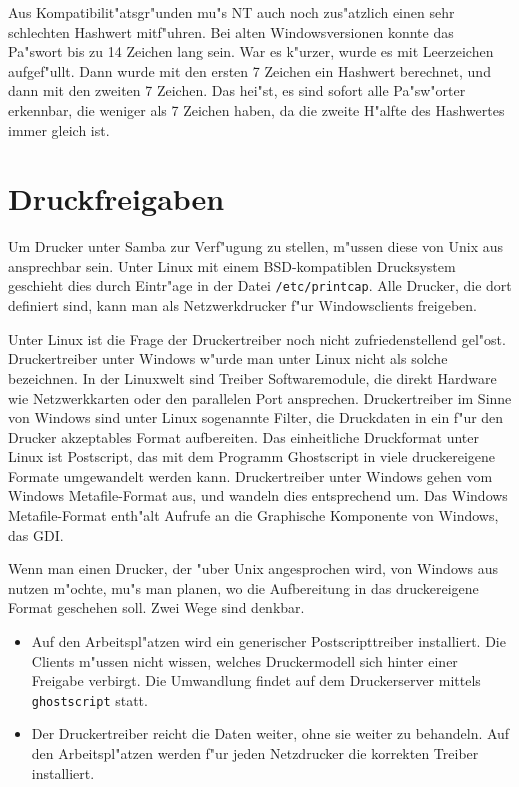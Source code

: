 \documentclass{scrartcl}
\newcommand{\prog}{\texttt}
\newcommand{\datei}{\texttt}
\begin{document}
Aus Kompatibilit"atsgr"unden mu"s NT auch noch zus"atzlich einen sehr
schlechten Hashwert mitf"uhren. Bei alten Windowsversionen konnte das
Pa"swort bis zu 14 Zeichen lang sein. War es k"urzer, wurde es mit
Leerzeichen aufgef"ullt. Dann wurde mit den ersten 7 Zeichen ein
Hashwert berechnet, und dann mit den zweiten 7 Zeichen. Das hei"st, es
sind sofort alle Pa"sw"orter erkennbar, die weniger als 7 Zeichen
haben, da die zweite H"alfte des Hashwertes immer gleich ist.

\section{Druckfreigaben}

Um Drucker unter Samba zur Verf"ugung zu stellen, m"ussen diese von
Unix aus ansprechbar sein. Unter Linux mit einem BSD-kompatiblen
Drucksystem geschieht dies durch Eintr"age in der Datei
\datei{/etc/printcap}. Alle Drucker, die dort definiert sind, kann man
als Netzwerkdrucker f"ur Windowsclients freigeben.

Unter Linux ist die Frage der Druckertreiber noch nicht
zufriedenstellend gel"ost. Druckertreiber unter Windows w"urde man
unter Linux nicht als solche bezeichnen. In der Linuxwelt sind Treiber
Softwaremodule, die direkt Hardware wie Netzwerkkarten oder den
parallelen Port ansprechen. Druckertreiber im Sinne von Windows sind
unter Linux sogenannte Filter, die Druckdaten in ein f"ur den Drucker
akzeptables Format aufbereiten. Das einheitliche Druckformat unter
Linux ist Postscript, das mit dem Programm Ghostscript in viele
druckereigene Formate umgewandelt werden kann. Druckertreiber unter
Windows gehen vom Windows Metafile-Format aus, und wandeln dies
entsprechend um. Das Windows Metafile-Format enth"alt Aufrufe an die
Graphische Komponente von Windows, das GDI.

Wenn man einen Drucker, der "uber Unix angesprochen wird, von Windows
aus nutzen m"ochte, mu"s man planen, wo die Aufbereitung in das
druckereigene Format geschehen soll. Zwei Wege sind denkbar.

\begin{itemize}
\item Auf den Arbeitspl"atzen wird ein generischer Postscripttreiber
  installiert. Die Clients m"ussen nicht wissen, welches Druckermodell
  sich hinter einer Freigabe verbirgt.  Die Umwandlung findet auf dem
  Druckerserver mittels \prog{ghostscript} statt.
\item Der Druckertreiber reicht die Daten weiter, ohne sie weiter zu
  behandeln. Auf den Arbeitspl"atzen werden f"ur jeden Netzdrucker die
  korrekten Treiber installiert.
\end{itemize}
\end{document}
